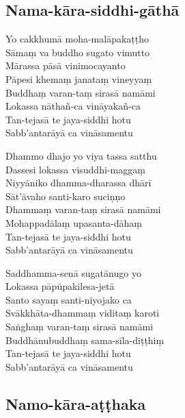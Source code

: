 \subsection{Nama-kāra-siddhi-gāthā}
\label{yo-cakkhuma}


\begin{paritta}
Yo cakkhumā moha-malāpakaṭṭho\\
Sāmaṃ va buddho sugato vimutto\\
Mārassa pāsā vinimocayanto\\
Pāpesi khemaṃ janataṃ vineyyaṃ\\
Buddhaṃ varan-taṃ sirasā namāmi\\
Lokassa nāthañ-ca vināyakañ-ca\\
Tan-tejasā te jaya-siddhi hotu\\
Sabb'antarāyā ca vināsamentu

Dhammo dhajo yo viya tassa satthu\\
Dassesi lokassa visuddhi-maggaṃ\\
Niyyāniko dhamma-dharassa dhārī\\
Sāt'āvaho santi-karo suciṇṇo\\
Dhammaṃ varan-taṃ sirasā namāmi\\
Mohappadālaṃ upasanta-dāhaṃ\\
Tan-tejasā te jaya-siddhi hotu\\
Sabb'antarāyā ca vināsamentu

Saddhamma-senā sugatānugo yo\\
Lokassa pāpūpakilesa-jetā\\
Santo sayaṃ santi-niyojako ca\\
Svākkhāta-dhammaṃ viditaṃ karoti\\
Saṅghaṃ varan-taṃ sirasā namāmi\\
Buddhānubuddhaṃ sama-sīla-diṭṭhiṃ\\
Tan-tejasā te jaya-siddhi hotu\\
Sabb'antarāyā ca vināsamentu 
\end{paritta}

\subsection{Namo-kāra-aṭṭhaka}
\label{namo-arahato}


